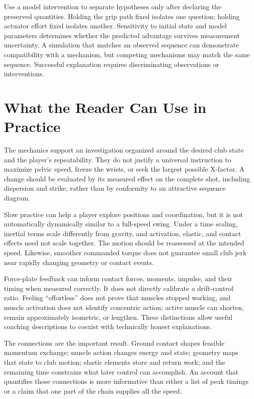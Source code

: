 Use a model intervention to separate hypotheses only after declaring the preserved quantities. Holding the grip path fixed isolates one question; holding actuator effort fixed isolates another. Sensitivity to initial state and model parameters determines whether the predicted advantage survives measurement uncertainty. A simulation that matches an observed sequence can demonstrate compatibility with a mechanism, but competing mechanisms may match the same sequence. Successful explanation requires discriminating observations or interventions.

\section{What the Reader Can Use in Practice}
The mechanics support an investigation organized around the desired club state and the player's repeatability. They do not justify a universal instruction to maximize pelvic speed, freeze the wrists, or seek the largest possible X-factor. A change should be evaluated by its measured effect on the complete shot, including dispersion and strike, rather than by conformity to an attractive sequence diagram.

Slow practice can help a player explore positions and coordination, but it is not automatically dynamically similar to a full-speed swing. Under a time scaling, inertial terms scale differently from gravity, and activation, elastic, and contact effects need not scale together. The motion should be reassessed at the intended speed. Likewise, smoother commanded torque does not guarantee small club jerk near rapidly changing geometry or contact events.

Force-plate feedback can inform contact forces, moments, impulse, and their timing when measured correctly. It does not directly calibrate a drift-control ratio. Feeling ``effortless'' does not prove that muscles stopped working, and muscle activation does not identify concentric action; active muscle can shorten, remain approximately isometric, or lengthen. These distinctions allow useful coaching descriptions to coexist with technically honest explanations.

The connections are the important result. Ground contact shapes feasible momentum exchange; muscle action changes energy and state; geometry maps that state to club motion; elastic elements store and return work; and the remaining time constrains what later control can accomplish. An account that quantifies those connections is more informative than either a list of peak timings or a claim that one part of the chain supplies all the speed.

